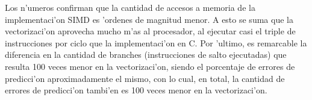 Los n'umeros confirman que la cantidad de accesos a memoria de la implementaci'on SIMD es 'ordenes de magnitud menor. A esto se suma que la vectorizaci'on aprovecha mucho m'as al procesador, al ejecutar casi el triple de instrucciones por ciclo que la implementaci'on en C. Por 'ultimo, es remarcable la diferencia en la cantidad de branches (instrucciones de salto ejecutadas) que resulta 100 veces menor en la vectorizaci'on, siendo el porcentaje de errores de predicci'on aproximadamente el mismo, con lo cual, en total, la cantidad de errores de predicci'on tambi'en es 100 veces menor en la vectorizaci'on.